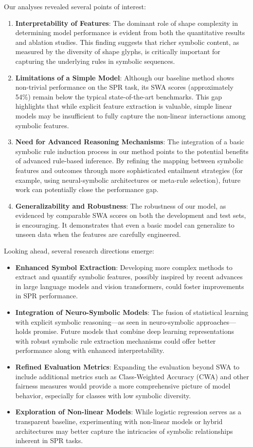 \documentclass{article}
\begin{document}
Our analyses revealed several points of interest:
\begin{enumerate}
    \item \textbf{Interpretability of Features}: The dominant role of shape complexity in determining model performance is evident from both the quantitative results and ablation studies. This finding suggests that richer symbolic content, as measured by the diversity of shape glyphs, is critically important for capturing the underlying rules in symbolic sequences.
    \item \textbf{Limitations of a Simple Model}: Although our baseline method shows non-trivial performance on the SPR task, its SWA scores (approximately 54\%) remain below the typical state-of-the-art benchmarks. This gap highlights that while explicit feature extraction is valuable, simple linear models may be insufficient to fully capture the non-linear interactions among symbolic features.
    \item \textbf{Need for Advanced Reasoning Mechanisms}: The integration of a basic symbolic rule induction process in our method points to the potential benefits of advanced rule-based inference. By refining the mapping between symbolic features and outcomes through more sophisticated entailment strategies (for example, using neural-symbolic architectures or meta-rule selection), future work can potentially close the performance gap.
    \item \textbf{Generalizability and Robustness}: The robustness of our model, as evidenced by comparable SWA scores on both the development and test sets, is encouraging. It demonstrates that even a basic model can generalize to unseen data when the features are carefully engineered.
\end{enumerate}

Looking ahead, several research directions emerge:
\begin{itemize}
    \item \textbf{Enhanced Symbol Extraction}: Developing more complex methods to extract and quantify symbolic features, possibly inspired by recent advances in large language models and vision transformers, could foster improvements in SPR performance.
    \item \textbf{Integration of Neuro-Symbolic Models}: The fusion of statistical learning with explicit symbolic reasoning—as seen in neuro-symbolic approaches—holds promise. Future models that combine deep learning representations with robust symbolic rule extraction mechanisms could offer better performance along with enhanced interpretability.
    \item \textbf{Refined Evaluation Metrics}: Expanding the evaluation beyond SWA to include additional metrics such as Class-Weighted Accuracy (CWA) and other fairness measures would provide a more comprehensive picture of model behavior, especially for classes with low symbolic diversity.
    \item \textbf{Exploration of Non-linear Models}: While logistic regression serves as a transparent baseline, experimenting with non-linear models or hybrid architectures may better capture the intricacies of symbolic relationships inherent in SPR tasks.
\end{itemize}
\end{document}
